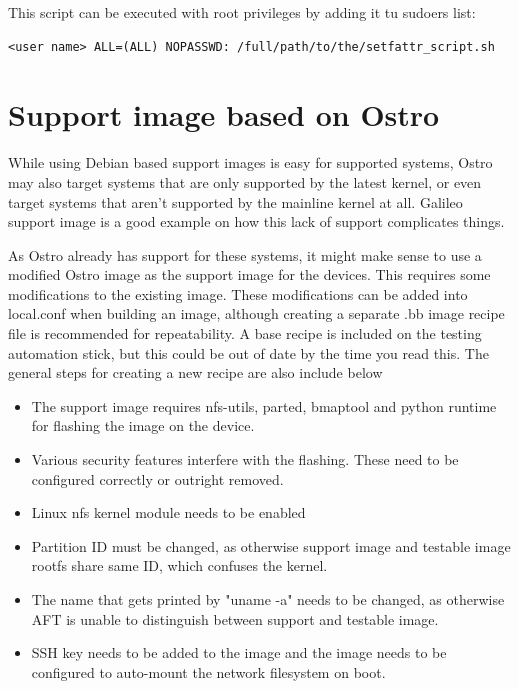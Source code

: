 \documentclass[a4paper,11pt]{article}
\begin{document}
This script can be executed with root privileges by adding it tu sudoers list:

\begin{lstlisting}
<user name> ALL=(ALL) NOPASSWD: /full/path/to/the/setfattr_script.sh
\end{lstlisting}

\section{Support image based on Ostro\texttrademark}

While using Debian based support images is easy for supported systems, Ostro may also target systems that are only supported by the latest kernel, or even target systems that aren't supported by the mainline kernel at all. Galileo support image is a good example on how this lack of support complicates things.

As Ostro already has support for these systems, it might make sense to use a modified Ostro image as the support image for the devices. This requires some modifications to the existing image. These modifications can be added into local.conf when building an image, although creating a separate .bb image recipe file is recommended for repeatability. A base recipe is included on the testing automation stick, but this could be out of date by the time you read this. The general steps for creating a new recipe are also include below

\begin{itemize}

\item The support image requires nfs-utils, parted, bmaptool and python runtime for flashing the image on the device.

\item Various security features interfere with the flashing. These need to be configured correctly or outright removed.

\item Linux nfs kernel module needs to be enabled

\item Partition ID must be changed, as otherwise support image and testable image rootfs share same ID, which confuses the kernel.

\item The name that gets printed by "uname -a" needs to be changed, as otherwise AFT is unable to distinguish between support and testable image.

\item SSH key needs to be added to the image and the image needs to be configured to auto-mount the network filesystem on boot.

\end{itemize}
\end{document}
